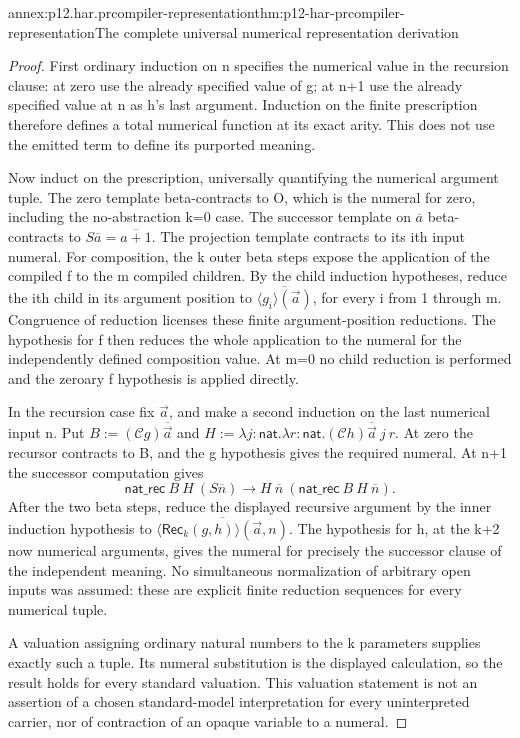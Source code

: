 \begin{annexitem}{annex:p12.har.prcompiler-representation}{thm:p12-har-prcompiler-representation}{The complete universal numerical representation derivation}
\begin{proof}
First ordinary induction on n specifies the numerical value in the
recursion clause: at zero use the already specified value of g; at
n+1 use the already specified value at n as h's last argument.
Induction on the finite prescription therefore defines a total numerical
function at its exact arity. This does not use the emitted term to
define its purported meaning.

Now induct on the prescription, universally quantifying the numerical
argument tuple. The zero template beta-contracts to O, which is the
numeral for zero, including the no-abstraction k=0 case. The successor
template on \(\overline a\) beta-contracts to
\(S\overline a=\overline{a+1}\). The projection template contracts
to its ith input numeral. For composition, the k outer beta steps
expose the application of the compiled f to the m compiled children.
By the child induction hypotheses, reduce the ith child in its argument
position to \(\overline{\langle g_i\rangle(\vec a)}\), for every
i from 1 through m. Congruence of reduction licenses these finite
argument-position reductions. The hypothesis for f then reduces the
whole application to the numeral for the independently defined
composition value. At m=0 no child reduction is performed and the
zeroary f hypothesis is applied directly.

In the recursion case fix \(\vec a\), and make a second induction
on the last numerical input n. Put
\(B:=(\mathcal C g)\overline{\vec a}\) and
\(H:=\lambda j:\mathsf{nat}.\lambda r:\mathsf{nat}.
(\mathcal C h)\overline{\vec a}\ j\ r\).
At zero the recursor contracts to B, and the g hypothesis gives the
required numeral. At n+1 the successor computation gives
\[
 \mathsf{nat\_rec}\ B\ H\ (S\overline n)
 \longrightarrow H\ \overline n\
                      (\mathsf{nat\_rec}\ B\ H\ \overline n).
\]
After the two beta steps, reduce the displayed recursive argument by
the inner induction hypothesis to
\(\overline{\langle\mathsf{Rec}_k(g,h)\rangle(\vec a,n)}\).
The hypothesis for h, at the k+2 now numerical arguments, gives the
numeral for precisely the successor clause of the independent meaning.
No simultaneous normalization of arbitrary open inputs was assumed:
these are explicit finite reduction sequences for every numerical tuple.

A valuation assigning ordinary natural numbers to the k parameters
supplies exactly such a tuple. Its numeral substitution is the displayed
calculation, so the result holds for every standard valuation. This
valuation statement is not an assertion of a chosen standard-model
interpretation for every uninterpreted carrier, nor of contraction of
an opaque variable to a numeral.
\end{proof}
\end{annexitem}

